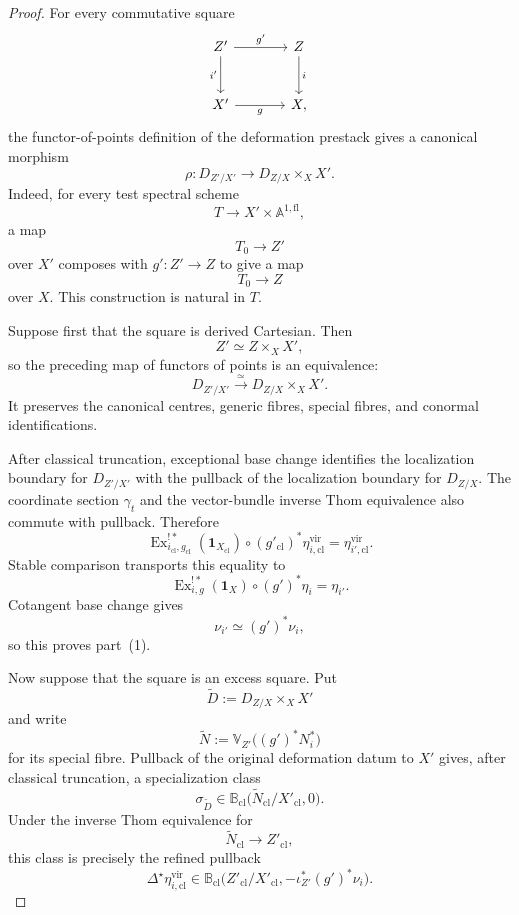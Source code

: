 \begin{proof}
For every commutative square
\[
\begin{tikzcd}[column sep=large,row sep=large]
    Z' \arrow[r,"g'"] \arrow[d,"i'"']
        & Z \arrow[d,"i"] \\
    X' \arrow[r,"g"']
        & X,
\end{tikzcd}
\]
the functor-of-points definition of the deformation prestack gives a
canonical morphism
\[
    \rho:
    D_{Z'/X'}
    \longrightarrow
    D_{Z/X}\times_XX'.
\]
Indeed, for every test spectral scheme
\[
    T\longrightarrow X'\times\mathbb A^{1,\mathrm{fl}},
\]
a map
\[
    T_0\longrightarrow Z'
\]
over \(X'\) composes with \(g':Z'\to Z\) to give a map
\[
    T_0\longrightarrow Z
\]
over \(X\).  This construction is natural in \(T\).

Suppose first that the square is derived Cartesian.  Then
\[
    Z'
    \simeq
    Z\times_XX',
\]
so the preceding map of functors of points is an equivalence:
\[
    D_{Z'/X'}
    \xrightarrow{\simeq}
    D_{Z/X}\times_XX'.
\]
It preserves the canonical centres, generic fibres, special fibres, and
conormal identifications.

After classical truncation, exceptional base change identifies the
localization boundary for \(D_{Z'/X'}\) with the pullback of the
localization boundary for \(D_{Z/X}\).  The coordinate section
\(\gamma_t\) and the vector-bundle inverse Thom equivalence also commute
with pullback.  Therefore
\[
    \operatorname{Ex}^{!*}_{i_{\mathrm{cl}},g_{\mathrm{cl}}}
    (\mathbf1_{X_{\mathrm{cl}}})
    \circ
    (g'_{\mathrm{cl}})^*
    \eta^{\mathrm{vir}}_{i,\mathrm{cl}}
    =
    \eta^{\mathrm{vir}}_{i',\mathrm{cl}}.
\]
Stable comparison transports this equality to
\[
    \operatorname{Ex}^{!*}_{i,g}(\mathbf1_X)
    \circ
    (g')^*\eta_i
    =
    \eta_{i'}.
\]
Cotangent base change gives
\[
    \nu_{i'}
    \simeq
    (g')^*\nu_i,
\]
so this proves part~(1).

Now suppose that the square is an excess square.  Put
\[
    \widetilde D
    :=
    D_{Z/X}\times_XX'
\]
and write
\[
    \widetilde N
    :=
    \mathbb V_{Z'}
    \bigl(
      (g')^*N_i^*
    \bigr)
\]
for its special fibre.  Pullback of the original deformation datum to
\(X'\) gives, after classical truncation, a specialization class
\[
    \sigma_{\widetilde D}
    \in
    \mathbb B_{\mathrm{cl}}
    \bigl(
      \widetilde N_{\mathrm{cl}}/X'_{\mathrm{cl}},
      0
    \bigr).
\]
Under the inverse Thom equivalence for
\[
    \widetilde N_{\mathrm{cl}}
    \longrightarrow
    Z'_{\mathrm{cl}},
\]
this class is precisely the refined pullback
\[
    \Delta^\star
    \eta^{\mathrm{vir}}_{i,\mathrm{cl}}
    \in
    \mathbb B_{\mathrm{cl}}
    \bigl(
      Z'_{\mathrm{cl}}/X'_{\mathrm{cl}},
      -\iota_{Z'}^*(g')^*\nu_i
    \bigr).
\]


\end{proof}
